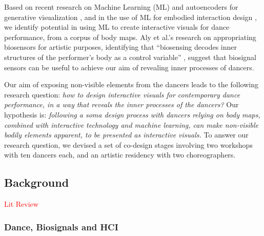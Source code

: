 Based on recent research on Machine Learning (ML) and autoencoders for generative visualization \cite{broad_autoencoding_2017, crnkovic-friis_generative_2016}, and in the use of ML for embodied interaction design \cite{plant_interactive_2021}, we identify potential in using ML to create interactive visuals for dance performance, from a corpus of body maps. Aly et al.’s research on appropriating biosensors for artistic purposes, identifying that “biosensing decodes inner structures of the performer’s body as a control variable” \cite{aly_appropriating_2021}, suggest that biosignal sensors can be useful to achieve our aim of revealing inner processes of dancers.

Our aim of exposing non-visible elements from the dancers leads to the following research question: \textit{how to design interactive visuals for contemporary dance performance, in a way that reveals the inner processes of the dancers?} Our hypothesis is: \textit{following a soma design process with dancers relying on body maps, combined with interactive technology and machine learning, can make non-visible bodily elements apparent, to be presented as interactive visuals.} To answer our research question, we devised a set of co-design stages involving two workshops with ten dancers each, and an artistic residency with two choreographers.

\subsection{Background}

\textcolor{red}{Lit Review}
\subsubsection{Dance, Biosignals and HCI}

